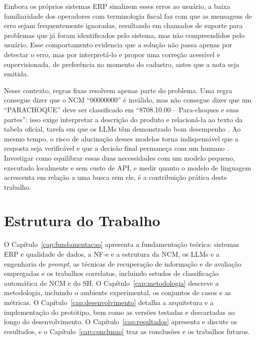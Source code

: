 Embora os próprios sistemas ERP sinalizem esses erros ao usuário, a baixa familiaridade dos operadores com terminologia fiscal faz com que as mensagens de erro sejam frequentemente ignoradas, resultando em chamados de suporte para problemas que já foram identificados pelo sistema, mas não compreendidos pelo usuário. Esse comportamento evidencia que a solução não passa apenas por detectar o erro, mas por interpretá-lo e propor uma correção acessível e supervisionada, de preferência no momento do cadastro, antes que a nota seja emitida.

Nesse contexto, regras fixas resolvem apenas parte do problema. Uma regra consegue dizer que o NCM ``00000000'' é inválido, mas não consegue dizer que um ``PARACHOQUE'' deve ser classificado em ``8708.10.00 -- Para-choques e suas partes'': isso exige interpretar a descrição do produto e relacioná-la ao texto da tabela oficial, tarefa em que os LLMs têm demonstrado bom desempenho \cite{gholamian2024llmclassification}. Ao mesmo tempo, o risco de alucinação desses modelos \cite{huang2025hallucination} torna indispensável que a resposta seja verificável e que a decisão final permaneça com um humano \cite{Natarajan2024AI2L}. Investigar como equilibrar essas duas necessidades com um modelo pequeno, executado localmente e sem custo de API, e medir quanto o modelo de linguagem acrescenta em relação a uma busca sem ele, é a contribuição prática deste trabalho.

\section{Estrutura do Trabalho}

O Capítulo~\ref{cap:fundamentacao} apresenta a fundamentação teórica: sistemas ERP e qualidade de dados, a NF-e e a estrutura da NCM, os LLMs e a engenharia de \textit{prompt}, as técnicas de recuperação de informação e de avaliação empregadas e os trabalhos correlatos, incluindo estudos de classificação automática de NCM e do SH. O Capítulo~\ref{cap:metodologia} descreve a metodologia, incluindo o ambiente experimental, os conjuntos de casos e as métricas. O Capítulo~\ref{cap:desenvolvimento} detalha a arquitetura e a implementação do protótipo, bem como as versões testadas e descartadas ao longo do desenvolvimento. O Capítulo~\ref{cap:resultados} apresenta e discute os resultados, e o Capítulo~\ref{cap:conclusao} traz as conclusões e os trabalhos futuros.
